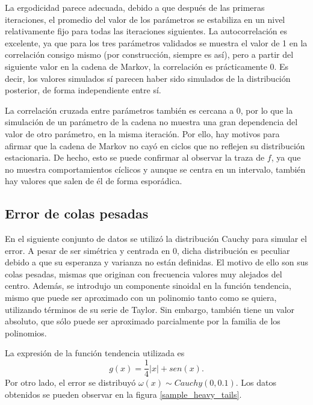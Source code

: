 La ergodicidad parece adecuada, debido a que después de las primeras iteraciones, el promedio del valor de los par\'ametros se estabiliza en un nivel relativamente fijo para todas las iteraciones siguientes. La autocorrelaci\'on es excelente, ya que para los tres par\'ametros validados se muestra el valor de 1 en la correlaci\'on consigo mismo (por construcci\'on, siempre es as\'i), pero a partir del siguiente valor en la cadena de Markov, la correlaci\'on es pr\'acticamente 0. Es decir, los valores simulados s\'i parecen haber sido simulados de la distribuci\'on posterior, de forma independiente entre s\'i.

La correlaci\'on cruzada entre par\'ametros tambi\'en es cercana a 0, por lo que la simulaci\'on de un par\'ametro de la cadena no muestra una gran dependencia del valor de otro par\'ametro, en la misma iteraci\'on. Por ello, hay motivos para afirmar que la cadena de Markov no cay\'o en ciclos que no reflejen su distribuci\'on estacionaria. De hecho, esto se puede confirmar al observar la traza de $f$, ya que no muestra comportamientos c\'iclicos y aunque se centra en un intervalo, tambi\'en hay valores que salen de \'el de forma espor\'adica.

\subsection{Error de colas pesadas}

En el siguiente conjunto de datos se utiliz\'o la distribuci\'on Cauchy para simular el error. A pesar de ser sim\'etrica y centrada en 0, dicha distribuci\'on es peculiar debido a que su esperanza y varianza no est\'an definidas. El motivo de ello son sus colas pesadas, mismas que originan con frecuencia valores muy alejados del centro. Adem\'as, se introdujo un componente sinoidal en la funci\'on tendencia, mismo que puede ser aproximado con un polinomio tanto como se quiera, utilizando t\'erminos de su serie de Taylor. Sin embargo, tambi\'en tiene un valor absoluto, que s\'olo puede ser aproximado parcialmente por la familia de los polinomios.

La expresi\'on de la funci\'on tendencia utilizada es \begin{equation*}
    g(x) = \frac{1}{4}|x| + sen(x).
\end{equation*}
Por otro lado, el error se distribuy\'o $\omega(x) \sim Cauchy(0,0.1)$. Los datos obtenidos se pueden observar en la figura \ref{sample_heavy_tails}.


